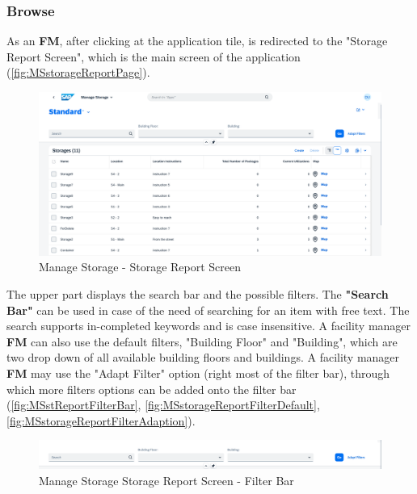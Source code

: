 \subsubsection{Browse}

As an \textbf{FM}, after clicking at the application tile, is redirected to the "Storage Report Screen", which is the main screen of the application (\autoref{fig:MSstorageReportPage}). 

\begin{figure}[H]
	\centering
	\includegraphics[width=1\linewidth]{images/user_doc/storage/StorageReportPage/reportDefaultOverview.png}
	\caption{Manage Storage - Storage Report Screen}
	\label{fig:MSstorageReportPage}
\end{figure}

The upper part displays the search bar and the possible filters. 
The \textbf{"Search Bar"} can be used in case of the need of searching for an item with free text. The search supports in-completed keywords and is case insensitive.
A facility manager \textbf{FM} can also use the default filters, "Building Floor" and "Building", which are two drop down of all available building floors and buildings. A facility manager \textbf{FM} may use the "Adapt Filter" option (right most of the filter bar), through which more filters options can be added onto the filter bar (\autoref{fig:MSstReportFilterBar}, 
\autoref{fig:MSstorageReportFilterDefault}, 
\autoref{fig:MSstorageReportFilterAdaption}).

\begin{figure}[htb]
	\centering
	\includegraphics[width=1\linewidth]{images/user_doc/storage/StorageReportPage/reportFilterBar.png}
	\caption{Manage Storage Storage Report Screen - Filter Bar}
	\label{fig:MSstReportFilterBar}
\end{figure}

